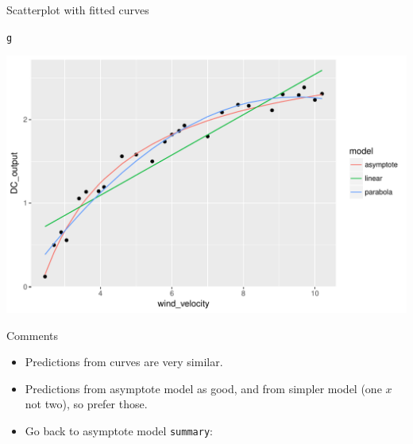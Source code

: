 \documentclass[unknownkeysallowed]{beamer}\usepackage[]{graphicx}\usepackage[]{color}
\makeatletter
\def\maxwidth{ %
  \ifdim\Gin@nat@width>\linewidth
    \linewidth
  \else
    \Gin@nat@width
  \fi
}
\newcommand{\hlstd}[1]{\textcolor[rgb]{0.345,0.345,0.345}{#1}}%
\newenvironment{kframe}{%
 \def\at@end@of@kframe{}%
 \ifinner\ifhmode%
  \def\at@end@of@kframe{\end{minipage}}%
  \begin{minipage}{\columnwidth}%
 \fi\fi%
 \def\FrameCommand##1{\hskip\@totalleftmargin \hskip-\fboxsep
 \colorbox{shadecolor}{##1}\hskip-\fboxsep
     \hskip-\linewidth \hskip-\@totalleftmargin \hskip\columnwidth}%
 \MakeFramed {\advance\hsize-\width
   \@totalleftmargin\z@ \linewidth\hsize
   \@setminipage}}%
 {\par\unskip\endMakeFramed%
 \at@end@of@kframe}
\newenvironment{knitrout}{}{} %
\makeatother
\begin{document}
\begin{frame}[fragile]{Scatterplot with fitted curves}

\begin{knitrout}
\color{fgcolor}\begin{kframe}
\begin{alltt}
\hlstd{g}
\end{alltt}
\end{kframe}
\includegraphics[width=\maxwidth]{figure/unnamed-chunk-260-1} 

\end{knitrout}
  
\end{frame}

\begin{frame}[fragile]{Comments}

  \begin{itemize}
  \item Predictions from curves are very similar.
  \item Predictions from asymptote model as good, and from simpler
    model (one $x$ not two), so prefer those.
  \item Go back to asymptote model \texttt{summary}:
  \end{itemize}
  
\end{frame}
\end{document}

